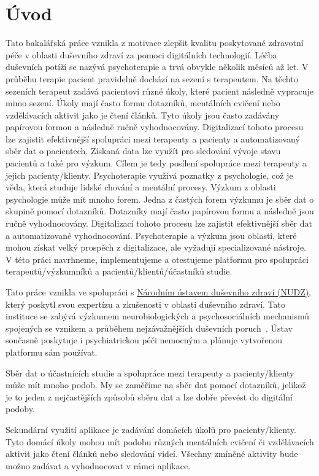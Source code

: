 \chapter*{Úvod}

Tato bakalářská práce vznikla z motivace zlepšit kvalitu poskytované zdravotní péče v oblasti duševního zdraví za pomoci digitálních technologií.
Léčba duševních potíží se nazývá psychoterapie a trvá obvykle několik měsíců až let.
V průběhu terapie pacient pravidelně dochází na sezení s terapeutem.
Na těchto sezeních terapeut zadává pacientovi různé úkoly, které pacient následně vypracuje mimo sezení.
Úkoly mají často formu dotazníků, mentálních cvičení nebo vzdělávacích aktivit jako je čtení článků.
Tyto úkoly jsou často zadávány papírovou formou a následně ručně vyhodnocovány.
Digitalizací tohoto procesu lze zajistit efektivnější spolupráci mezi terapeuty a pacienty a automatizovaný sběr dat o pacientech.
Získaná data lze využít pro sledování vývoje stavu pacientů a také pro výzkum.
Cílem je tedy posílení spolupráce mezi terapeuty a jejich pacienty/klienty.
Psychoterapie využívá poznatky z psychologie, což je věda, která studuje lidské chování a mentální procesy.
Výzkum z oblasti psychologie může mít mnoho forem.
Jedna z častých forem výzkumu je sběr dat o skupině pomocí dotazníků.
Dotazníky mají často papírovou formu a následně jsou ručně vyhodnocovány.
Digitalizací tohoto procesu lze zajistit efektivnější sběr dat a automatizované vyhodnocování.
Psychoterapie a výzkum jsou oblasti, které mohou získat velký prospěch z digitalizace, ale vyžadují specializované nástroje.
V této práci navrhneme, implementujeme a otestujeme platformu pro spolupráci terapeutů/výzkumníků a pacientů/klientů/účastníků studie.

Tato práce vznikla ve spolupráci s \href{https://www.nudz.cz/}{Národním ústavem duševního zdraví (NUDZ)}, který poskytl svou expertízu a zkušenosti v oblasti duševního zdraví.
Tato instituce se zabývá výzkumem neurobiologických a psychosociálních mechanismů spojených se vznikem a průběhem nejzávažnějších duševních poruch~\cite{nudz-profil}.
Ústav současně poskytuje i psychiatrickou péči nemocným a plánuje vytvořenou platformu sám používat.

Sběr dat o účastnících studie a spolupráce mezi terapeuty a pacienty/klienty může mít mnoho podob.
My se zaměříme na sběr dat pomocí dotazníků, jelikož je to jeden z nejčastějších způsobů sběru dat a lze dobře převést do digitální podoby.

Sekundární využití aplikace je zadávání domácích úkolů pro pacienty/klienty.
Tyto domácí úkoly mohou mít podobu různých mentálních cvičení či vzdělávacích aktivit jako čtení článků nebo sledování videí.
Všechny zmíněné aktivity bude možno zadávat a vyhodnocovat v rámci aplikace.

